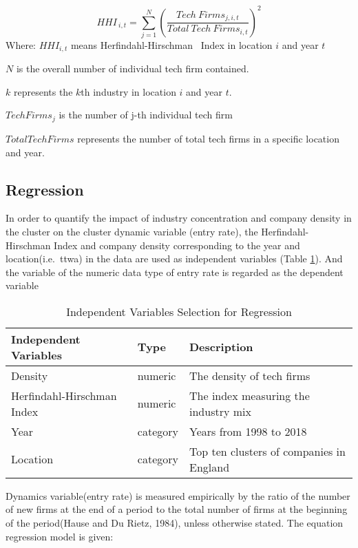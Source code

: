 \documentclass[
  12pt,
  oneside]{book}
\begin{document}
\[
HHI_{\ i,t} = \sum_{j=1}^N (\frac{Tech\ Firms_{j,i,t}}{Total\ Tech\ Firms_{i,t}})^2 
\]
Where:
\(HHI_{i,t}\) means Herfindahl-Hirschman ~Index in location \(i\) and year \(t\)

\(N\) is the overall number of individual tech firm contained.

\(k\) represents the \(k\)th industry in location \(i\) and year \(t\).

\(Tech Firms_j\) is the number of j-th individual tech firm

\(Total Tech Firms\) represents the number of total tech firms in a specific location and year.

\hypertarget{regression}{%
\subsection{Regression}\label{regression}}

In order to quantify the impact of industry concentration and company density in the cluster on the cluster dynamic variable (entry rate), the Herfindahl-Hirschman Index and company density corresponding to the year and location(i.e.~ttwa) in the data are used as independent variables (Table \ref{tab:tab-reg-idp-var}). And the variable of the numeric data type of entry rate is regarded as the dependent variable

\begin{table}

\caption{\label{tab:tab-reg-idp-var}Independent Variables Selection for Regression}
\centering
\begin{tabular}[t]{lll}
\toprule
\textbf{Independent Variables} & \textbf{Type} & \textbf{Description}\\
\midrule
Density & numeric & The density of tech firms\\
Herfindahl-Hirschman Index & numeric & The index measuring the industry mix\\
Year & category & Years from 1998 to 2018\\
Location & category & Top ten clusters of companies in England\\
\bottomrule
\end{tabular}
\end{table}

Dynamics variable(entry rate) is measured empirically by the ratio of the number of new firms at the end of a period to the total number of firms at the beginning of the period(Hause and Du Rietz, 1984), unless otherwise stated. The equation regression model is given:
\end{document}
